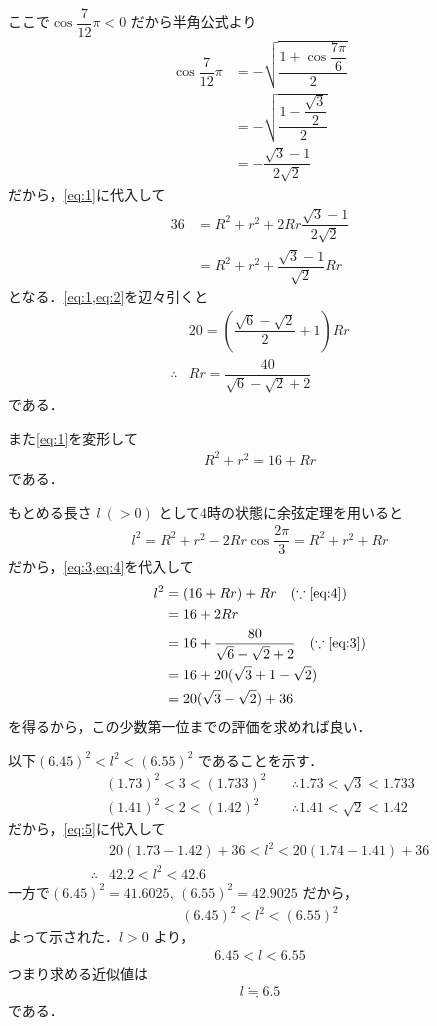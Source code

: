 \documentclass[../../main.tex]{subfiles}
\begin{document}
ここで$\cos \dfrac{7}{12}\pi < 0$ だから半角公式より
\begin{align}
  \cos \dfrac{7}{12}\pi
  &= -\sqrt{\dfrac{1 + \cos \dfrac{7\pi}{6}}{2}} \\
  &= -\sqrt{\dfrac{1 - \dfrac{\sqrt{3}}{2}}{2}} \\
  &= -\dfrac{\sqrt{3}-1}{2\sqrt{2}}
\end{align}
だから，\cref{eq:1}に代入して
\begin{align}
  36
  &= R^2 + r^2 + 2Rr \dfrac{\sqrt{3}-1}{2\sqrt{2}} \\
  &= R^2 + r^2 + \dfrac{\sqrt{3}-1}{\sqrt{2}} Rr \label{eq:2}
\end{align}
となる．\cref{eq:1,eq:2}を辺々引くと
\begin{align}
  & 20 = \left( \dfrac{\sqrt{6}-\sqrt{2}}{2} + 1 \right) Rr \\
  \therefore
  & Rr = \dfrac{40}{\sqrt{6}-\sqrt{2}+2} \label{eq:3}
\end{align}
である．

また\cref{eq:1}を変形して
\begin{align}
  R^2 + r^2 = 16 + Rr \label{eq:4}
\end{align}
である．

もとめる長さ $l\ (>0)$ として4時の状態に余弦定理を用いると
\begin{align}
  l^2 = R^2 + r^2 - 2Rr \cos \dfrac{2\pi}{3} = R^2 + r^2 + Rr
\end{align}
だから，\cref{eq:3,eq:4}を代入して
\begin{align}
  l^2 &= (16 + Rr) + Rr \quad (\because \text{\cref{eq:4}}) \\
  &= 16 + 2Rr \\
  &= 16 + \dfrac{80}{\sqrt{6}-\sqrt{2}+2} \quad (\because \text{\cref{eq:3}}) \\
  &= 16 + 20(\sqrt{3}+1-\sqrt{2}) \\
  &= 20(\sqrt{3}-\sqrt{2}) + 36 \label{eq:5}
\end{align}
を得るから，この少数第一位までの評価を求めれば良い．

以下$(6.45)^2 < l^2 < (6.55)^2$ であることを示す．
\begin{align}
  (1.73)^2 < 3 < (1.733)^2 \quad &\therefore 1.73 < \sqrt{3} < 1.733 \\
  (1.41)^2 < 2 < (1.42)^2 \quad &\therefore 1.41 < \sqrt{2} < 1.42
\end{align}
だから，\cref{eq:5}に代入して
\begin{align}
  & 20(1.73 - 1.42) + 36 < l^2 < 20(1.74 - 1.41) + 36 \\
  \therefore
  &42.2 < l^2 < 42.6
\end{align}
一方で$(6.45)^2 = 41.6025$, $(6.55)^2 = 42.9025$ だから，
\begin{align}
  (6.45)^2 < l^2 < (6.55)^2
\end{align}
よって示された．$l > 0$ より，
\begin{align}
  6.45 < l < 6.55
\end{align}
つまり求める近似値は
\begin{align}
  l \fallingdotseq 6.5
\end{align}
である．

\newpage
\end{document}
